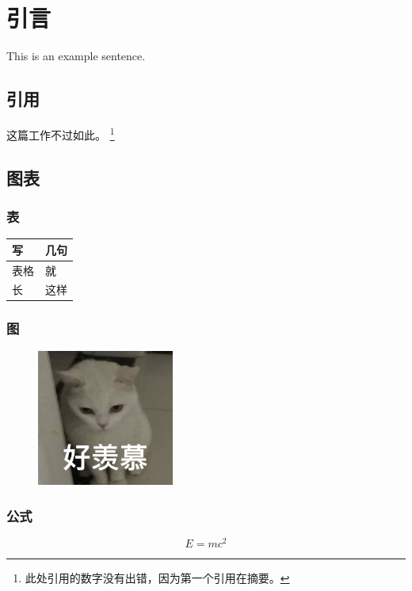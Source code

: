 
\chapter{引言}

This is an example sentence.

\section{引用}
这篇工作\cite{vaswani2017attention}不过如此。
\footnote{此处引用的数字没有出错，因为第一个引用在摘要。}

\section{图表}

\subsection{表}

\begin{table}[htbp]
    \centering
    \label{tab:example}
    \begin{tabular}{ll}
    \toprule
    \textbf{写} & \textbf{几句} \\
    \midrule

    表格 & 就  \\
    
    长  & 这样 \\
    
    \bottomrule

    \end{tabular}
\end{table}

\subsection{图}

\begin{figure}[htb]
    \centering
        \includegraphics[width=0.4\textwidth]{image/example.jpeg}

    \label{fig:2-par_arch}
\end{figure}

\subsection{公式}

\begin{equation}
    E = mc^{2}
\end{equation}

\pkuthssffaq %

